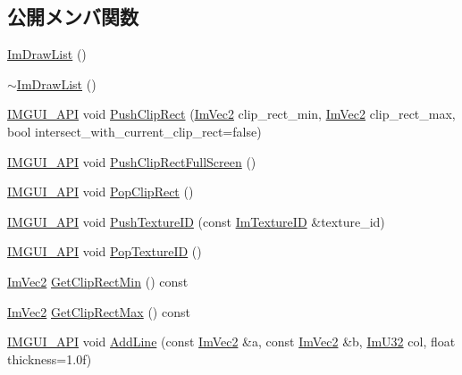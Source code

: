 \subsection*{公開メンバ関数}
\begin{DoxyCompactItemize}
\item 
\mbox{\hyperlink{struct_im_draw_list_a297376db2edb295095171dcc2dbed860}{Im\+Draw\+List}} ()
\item 
\mbox{\hyperlink{struct_im_draw_list_a19fd8d920c202cf8ba5f5c55c43d1d2a}{$\sim$\+Im\+Draw\+List}} ()
\item 
\mbox{\hyperlink{imgui_8h_a43829975e84e45d1149597467a14bbf5}{I\+M\+G\+U\+I\+\_\+\+A\+PI}} void \mbox{\hyperlink{struct_im_draw_list_acb34e2d3708616cae4567f3b4af06962}{Push\+Clip\+Rect}} (\mbox{\hyperlink{struct_im_vec2}{Im\+Vec2}} clip\+\_\+rect\+\_\+min, \mbox{\hyperlink{struct_im_vec2}{Im\+Vec2}} clip\+\_\+rect\+\_\+max, bool intersect\+\_\+with\+\_\+current\+\_\+clip\+\_\+rect=false)
\item 
\mbox{\hyperlink{imgui_8h_a43829975e84e45d1149597467a14bbf5}{I\+M\+G\+U\+I\+\_\+\+A\+PI}} void \mbox{\hyperlink{struct_im_draw_list_a0ab1ab409f0e269755e50a77901bae39}{Push\+Clip\+Rect\+Full\+Screen}} ()
\item 
\mbox{\hyperlink{imgui_8h_a43829975e84e45d1149597467a14bbf5}{I\+M\+G\+U\+I\+\_\+\+A\+PI}} void \mbox{\hyperlink{struct_im_draw_list_a44f40c59ca755f559020f5a7fa81103a}{Pop\+Clip\+Rect}} ()
\item 
\mbox{\hyperlink{imgui_8h_a43829975e84e45d1149597467a14bbf5}{I\+M\+G\+U\+I\+\_\+\+A\+PI}} void \mbox{\hyperlink{struct_im_draw_list_ac0dc0ecf692ab4c6ce58dd5381efb20d}{Push\+Texture\+ID}} (const \mbox{\hyperlink{imgui_8h_a364f4447ecbc4ca176145ccff9db6286}{Im\+Texture\+ID}} \&texture\+\_\+id)
\item 
\mbox{\hyperlink{imgui_8h_a43829975e84e45d1149597467a14bbf5}{I\+M\+G\+U\+I\+\_\+\+A\+PI}} void \mbox{\hyperlink{struct_im_draw_list_ade9286c5ca58753f7bd571b30e2ff76c}{Pop\+Texture\+ID}} ()
\item 
\mbox{\hyperlink{struct_im_vec2}{Im\+Vec2}} \mbox{\hyperlink{struct_im_draw_list_a9d83896d3eb434a9e1072d56523a2754}{Get\+Clip\+Rect\+Min}} () const
\item 
\mbox{\hyperlink{struct_im_vec2}{Im\+Vec2}} \mbox{\hyperlink{struct_im_draw_list_a8e484a61eab501c1c1c416a8b45bb08e}{Get\+Clip\+Rect\+Max}} () const
\item 
\mbox{\hyperlink{imgui_8h_a43829975e84e45d1149597467a14bbf5}{I\+M\+G\+U\+I\+\_\+\+A\+PI}} void \mbox{\hyperlink{struct_im_draw_list_a6db76ca2506dc86ad4d602fdcd2e2ea8}{Add\+Line}} (const \mbox{\hyperlink{struct_im_vec2}{Im\+Vec2}} \&a, const \mbox{\hyperlink{struct_im_vec2}{Im\+Vec2}} \&b, \mbox{\hyperlink{imgui_8h_a118cff4eeb8d00e7d07ce3d6460eed36}{Im\+U32}} col, float thickness=1.\+0f)

\end{DoxyCompactItemize}
